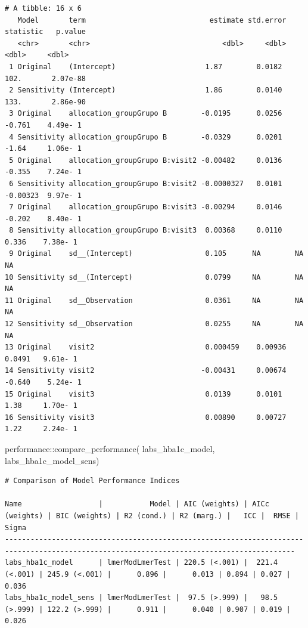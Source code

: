 \documentclass[
  12pt,
]{article}
\newenvironment{Shaded}{\begin{snugshade}}{\end{snugshade}}
\newcommand{\FunctionTok}[1]{\textcolor[rgb]{0.28,0.35,0.67}{#1}}
\newcommand{\NormalTok}[1]{\textcolor[rgb]{0.00,0.23,0.31}{#1}}
\newcommand{\SpecialCharTok}[1]{\textcolor[rgb]{0.37,0.37,0.37}{#1}}
\begin{document}
\begin{verbatim}
# A tibble: 16 x 6
   Model       term                             estimate std.error statistic   p.value
   <chr>       <chr>                               <dbl>     <dbl>     <dbl>     <dbl>
 1 Original    (Intercept)                     1.87        0.0182  102.       2.07e-88
 2 Sensitivity (Intercept)                     1.86        0.0140  133.       2.86e-90
 3 Original    allocation_groupGrupo B        -0.0195      0.0256   -0.761    4.49e- 1
 4 Sensitivity allocation_groupGrupo B        -0.0329      0.0201   -1.64     1.06e- 1
 5 Original    allocation_groupGrupo B:visit2 -0.00482     0.0136   -0.355    7.24e- 1
 6 Sensitivity allocation_groupGrupo B:visit2 -0.0000327   0.0101   -0.00323  9.97e- 1
 7 Original    allocation_groupGrupo B:visit3 -0.00294     0.0146   -0.202    8.40e- 1
 8 Sensitivity allocation_groupGrupo B:visit3  0.00368     0.0110    0.336    7.38e- 1
 9 Original    sd__(Intercept)                 0.105      NA        NA       NA       
10 Sensitivity sd__(Intercept)                 0.0799     NA        NA       NA       
11 Original    sd__Observation                 0.0361     NA        NA       NA       
12 Sensitivity sd__Observation                 0.0255     NA        NA       NA       
13 Original    visit2                          0.000459    0.00936   0.0491   9.61e- 1
14 Sensitivity visit2                         -0.00431     0.00674  -0.640    5.24e- 1
15 Original    visit3                          0.0139      0.0101    1.38     1.70e- 1
16 Sensitivity visit3                          0.00890     0.00727   1.22     2.24e- 1
\end{verbatim}

\begin{Shaded}
\begin{Highlighting}[]
\NormalTok{performance}\SpecialCharTok{::}\FunctionTok{compare\_performance}\NormalTok{(}
\NormalTok{    labs\_hba1c\_model, }
\NormalTok{    labs\_hba1c\_model\_sens) }
\end{Highlighting}
\end{Shaded}

\begin{verbatim}
# Comparison of Model Performance Indices

Name                  |           Model | AIC (weights) | AICc (weights) | BIC (weights) | R2 (cond.) | R2 (marg.) |   ICC |  RMSE | Sigma
------------------------------------------------------------------------------------------------------------------------------------------
labs_hba1c_model      | lmerModLmerTest | 220.5 (<.001) |  221.4 (<.001) | 245.9 (<.001) |      0.896 |      0.013 | 0.894 | 0.027 | 0.036
labs_hba1c_model_sens | lmerModLmerTest |  97.5 (>.999) |   98.5 (>.999) | 122.2 (>.999) |      0.911 |      0.040 | 0.907 | 0.019 | 0.026
\end{verbatim}
\end{document}
